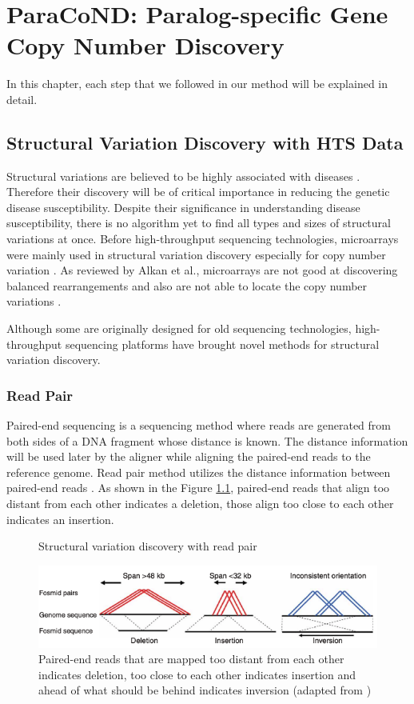 \chapter{ParaCoND: Paralog-specific Gene Copy Number Discovery}
In this chapter, each step that we followed in our method will be explained in detail.
\section{Structural Variation Discovery with HTS Data}
Structural variations are believed to be highly associated with diseases \cite{fanciulli2007fcgr3b,fellermann2006chromosome,aitman2006copy,gonzalez2005influence}. Therefore their discovery will be of critical importance in reducing the genetic disease susceptibility. Despite their significance in understanding disease susceptibility, there is no algorithm yet to find all types and sizes of structural variations at once. Before high-throughput sequencing technologies, microarrays were mainly used in structural variation discovery especially for copy number variation \cite{alkan2011genome}. As reviewed by Alkan et al., microarrays are not good at discovering balanced rearrangements and also are not able to locate the copy number variations \cite{alkan2011genome}. 

Although some are originally designed for old sequencing technologies, high-throughput sequencing platforms have brought novel methods for structural variation discovery. 
\subsection{Read Pair}
Paired-end sequencing is a sequencing method where reads are generated from both sides of a DNA fragment whose distance is known. The distance information will be used later by the aligner while aligning the paired-end reads to the reference genome. Read pair method utilizes the distance information between paired-end reads \cite{tuzun2005fine}. As shown in the Figure \ref{readpair}, paired-end reads that align too distant from each other indicates a deletion, those align too close to each other indicates an insertion.

\begin{figure}[ht]
    \centering
    \caption{Structural variation discovery with read pair}
    \includegraphics[scale=0.4]{images/readpair.png}
    \caption*{Paired-end reads that are mapped too distant from each other indicates deletion, too close to each other indicates insertion and ahead of what should be behind indicates inversion (adapted from \cite{tuzun2005fine})}
    \label{readpair}
\end{figure}

